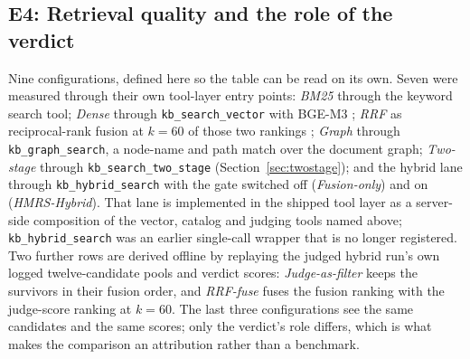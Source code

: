 \subsection{E4: Retrieval quality and the role of the verdict}
\label{sec:e4}
\label{sec:eval-retrieval}

Nine configurations, defined here so the table can be read on its own. Seven
were measured through their own tool-layer entry points: \emph{BM25} through the
keyword search tool; \emph{Dense} through \texttt{kb\_search\_vector} with
BGE-M3 \cite{bge-m3}; \emph{RRF} as reciprocal-rank fusion at $k=60$ of those
two rankings \cite{rrf-cormack}; \emph{Graph} through
\texttt{kb\_graph\_search}, a node-name and path match over the document graph;
\emph{Two-stage} through \texttt{kb\_search\_two\_stage}
(Section~\ref{sec:twostage}); and the hybrid lane through
\texttt{kb\_hybrid\_search} with the gate switched off
(\emph{Fusion-only}) and on (\emph{HMRS-Hybrid}). That lane is implemented in
the shipped tool layer as a server-side composition of the vector, catalog and
judging tools named above; \texttt{kb\_hybrid\_search} was an earlier single-call
wrapper that is no longer registered. Two further rows are derived
offline by replaying the judged hybrid run's own logged twelve-candidate pools
and verdict scores: \emph{Judge-as-filter} keeps the survivors in their fusion
order, and \emph{RRF-fuse} fuses the fusion ranking with the judge-score
ranking at $k=60$. The last three configurations see the same candidates and
the same scores; only the verdict's role differs, which is what makes the
comparison an attribution rather than a benchmark.

